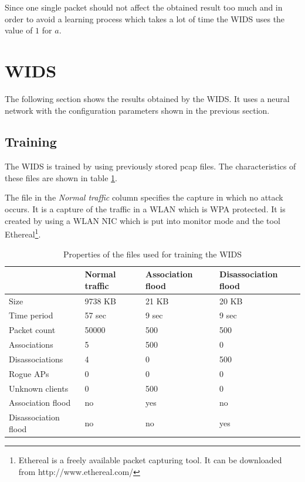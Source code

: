 \begin{description}
Since one single packet should not affect the obtained result too much and 
in order to avoid a learning process which takes a lot of time the WIDS uses the value of $1$ for $a$.

\end{description}

\section{WIDS}
\label{sec:results_wids}

The following section shows the results obtained by the WIDS. It uses a neural network with the configuration parameters shown in the previous section.

\subsection{Training}

The WIDS is trained by using previously stored pcap files. The characteristics of these files are shown in table \ref{train_env}.

The file in the {\em Normal traffic} column specifies the capture in which no attack occurs. It is a capture of the traffic in a WLAN which is WPA protected. It is created by using a WLAN NIC which is put into monitor mode and the tool Ethereal\footnote{Ethereal is a freely available packet capturing tool. It can be downloaded from http://www.ethereal.com/}.

\begin{table}[htbp]
	\begin{center}
		\begin{tabular}{|l|p{60pt}|p{60pt}|p{75pt}|}
		\hline
		&\bf{Normal traffic}&\bf{Association flood}&\bf{Disassociation flood} \\
		\hline
		Size&9738 KB&21 KB&20 KB\\
		\hline
		Time period&57 sec&9 sec&9 sec\\
		\hline
		Packet count&50000&500&500\\
		\hline
		Associations&5&500&0\\
		\hline
		Disassociations&4&0&500\\
		\hline
		\hline
		Rogue APs&0&0&0\\
		\hline
		Unknown clients&0&500&0\\
		\hline
		Association flood&no&yes&no\\
		\hline
		Disassociation flood&no&no&yes\\
		\hline
		\end{tabular}
	\end{center}
	\vspace{-1em}
	\caption{Properties of the files used for training the WIDS}
	\label{train_env}
\end{table}

